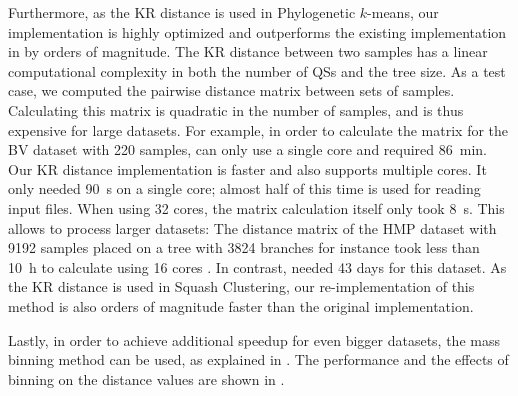 Furthermore, as the KR distance is used in Phylogenetic $k$-means, %
our implementation is highly optimized and
outperforms the existing implementation in  \cite{Matsen2010} by orders of magnitude.
The KR distance between two samples has a linear computational complexity in both the number of \acp{QS} and the tree size.
As a test case, we computed the pairwise distance matrix between sets of samples.
Calculating this matrix is quadratic in the number of samples,
and is thus expensive for large datasets.
For example, in order to calculate the matrix for the \ac{BV} dataset with \num{220} samples,
 can only use a single core and required \SI{86}{\minute}.
Our KR distance implementation  is faster and also supports multiple cores.
It only needed \SI{90}{\second} on a single core; almost half of this time is used for reading input files.
When using \num{32} cores, the matrix calculation itself only took \SI{8}{\second}.
This allows to process larger datasets:
The distance matrix of the \ac{HMP} dataset with \num{9 192} samples placed on a tree with \num{3 824} branches
for instance took less than \SI{10}{\hour} to calculate using \num{16} cores .
In contrast,  needed \num{43} days for this dataset.
As the KR distance is used in Squash Clustering, our re-implementation of this method
is also orders of magnitude faster than the original  implementation.

Lastly, in order to achieve additional speedup for even bigger datasets, the mass binning method can be used,
as explained in .
The performance and the effects of binning on the distance values are shown in .

